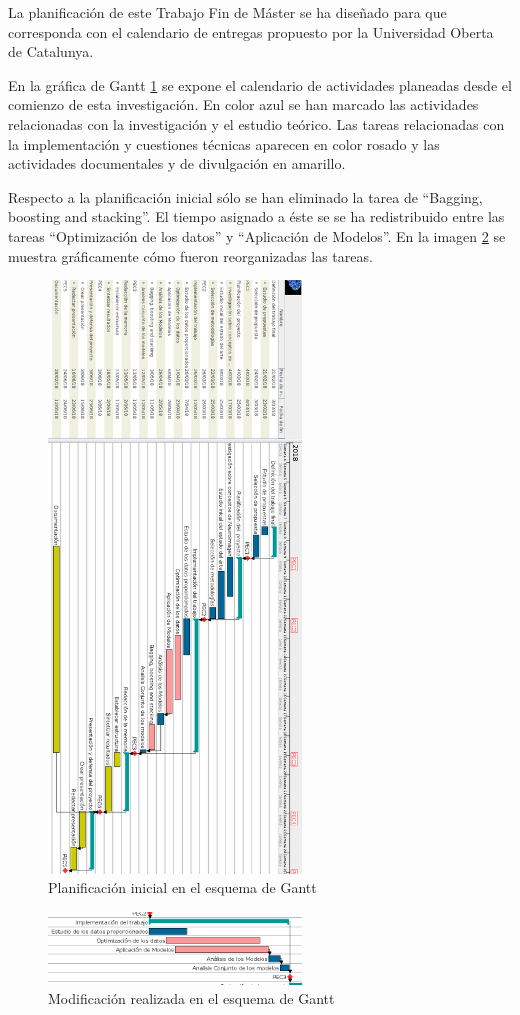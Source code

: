 La planificación de este Trabajo Fin de Máster se ha diseñado para que corresponda con el calendario de entregas propuesto por la Universidad Oberta de Catalunya.

En la gráfica de Gantt \ref{figure:gantt} se expone el calendario de actividades planeadas desde el comienzo de esta investigación. En color azul se han marcado las actividades relacionadas con la investigación y el estudio teórico. Las tareas relacionadas con la implementación y cuestiones técnicas aparecen en color rosado y las actividades documentales y de divulgación en amarillo.

Respecto a la planificación inicial sólo se han eliminado la tarea de ``Bagging, boosting and stacking''. El tiempo asignado a éste se se ha redistribuido entre las tareas ``Optimización de los datos'' y ``Aplicación de Modelos''. En la imagen \ref{figure:ganttmod} se muestra gráficamente cómo fueron reorganizadas las tareas.

\begin{figure}[ht]
\centering
\includegraphics[width=0.6\textwidth]{figs/planificacion/gantt.png}
\caption{Planificación inicial en el esquema de Gantt}
\label{figure:gantt}
\end{figure}

\begin{figure}[H]
\centering
\includegraphics[width=0.6\textwidth]{figs/planificacion/modificacion.png}
\caption{Modificación realizada en el esquema de Gantt}
\label{figure:ganttmod}
\end{figure}